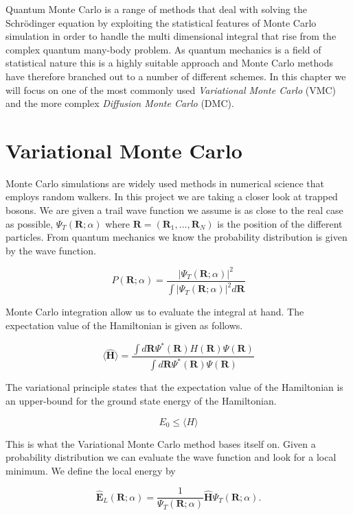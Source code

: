 Quantum Monte Carlo is a range of methods that deal with solving the Schrödinger equation by exploiting the statistical features of Monte Carlo simulation in order to handle the multi dimensional integral that rise from the complex quantum many-body problem. As quantum mechanics is a field of statistical nature this is a highly suitable approach and Monte Carlo methods have therefore branched out to a number of different schemes. In this chapter we will focus on one of the most commonly used \textit{Variational Monte Carlo} (VMC) and the more complex \textit{Diffusion Monte Carlo} (DMC).

\section{Variational Monte Carlo}

Monte Carlo simulations are widely used methods in numerical science that employs random walkers. 
In this project we are taking a closer look at trapped bosons. We are given a trail wave function we assume is as close to the real case as possible, $\Psi_T(\mathbf{R};\alpha)$ where $\mathbf{R} = (\mathbf{R}_1, ... , \mathbf{R}_N)$ is the position of the different particles. 
From quantum mechanics we know the probability distribution is given by the wave function. 

\begin{equation} \label{eq:prob_dist}
P(\mathbf{R}; \alpha) = \frac{|\Psi_T(\mathbf{R};\alpha)|^2}{\int|\Psi_T(\mathbf{R};\alpha)|^2 d\mathbf{R}}
\end{equation} 

Monte Carlo integration allow us to evaluate the integral at hand. The expectation value of the Hamiltonian is given as follows. 

$$\langle \widehat{\mathbf{H}}\rangle = \frac{\int d \mathbf{R} \Psi^{\ast} (\mathbf{R})H(\mathbf{R}) \Psi(\mathbf{R})}{\int d \mathbf{R} \Psi^{\ast} (\mathbf{R}) \Psi(\mathbf{R})}$$

The variational principle states that the expectation value of the Hamiltonian is an upper-bound for the ground state energy of the Hamiltonian.

$$E_0 \leq \langle H \rangle$$

This is what the Variational Monte Carlo method bases itself on. Given a probability distribution we can evaluate the wave function and look for a local minimum. We define the local energy by

$$\widehat{\mathbf{E}}_L(\mathbf{R};\alpha) = \frac{1}{\Psi_T(\mathbf{R};\alpha)}\widehat{\mathbf{H}}\Psi_T(\mathbf{R};\alpha).$$

